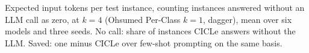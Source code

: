 \begin{table}[t]
  \centering
  \small
  \setlength{\tabcolsep}{4pt}
  
  \caption{Expected input tokens per test instance, counting instances answered without an LLM call as zero, at $k = 4$ (Ohsumed Per-Class $k = 1$, dagger), mean over six models and three seeds. No call: share of instances CICLe answers without the LLM. Saved: one minus CICLe over few-shot prompting on the same basis.}
  \label{tab:cost}
\end{table}
